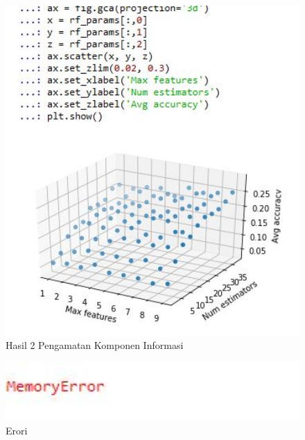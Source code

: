 \begin{figure}[ht]
	\centerline{\includegraphics[width=1\textwidth]{figures/huda/chapter3_praktek/33.JPG}}
	\caption{Hasil 2 Pengamatan Komponen Informasi}
	\label{h37}
\end{figure}

\begin{figure}[ht]
	\centerline{\includegraphics[width=1\textwidth]{figures/huda/chapter3_praktek/eror.JPG}}
	\caption{Erori}
	\label{h38}
\end{figure}